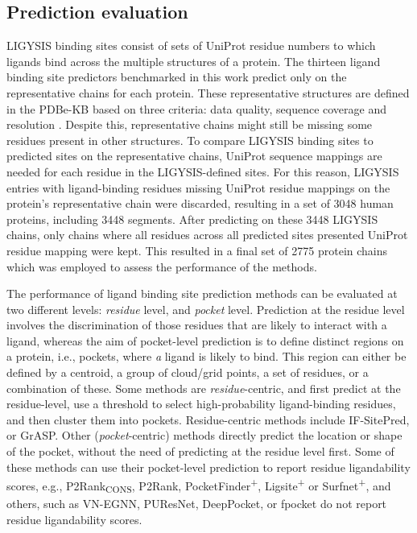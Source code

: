 \subsection{Prediction evaluation}

LIGYSIS binding sites consist of sets of UniProt residue numbers to which ligands bind across the multiple structures of a protein. The thirteen ligand binding site predictors benchmarked in this work predict only on the representative chains for each protein. These representative structures are defined in the PDBe-KB based on three criteria: data quality, sequence coverage and resolution \cite{ELLAWAY_2024_CONFORMATIONS}. Despite this, representative chains might still be missing some residues present in other structures. To compare LIGYSIS binding sites to predicted sites on the representative chains, UniProt sequence mappings are needed for each residue in the LIGYSIS-defined sites. For this reason, LIGYSIS entries with ligand-binding residues missing UniProt residue mappings on the protein’s representative chain were discarded, resulting
in a set of 3048 human proteins, including 3448 segments. After predicting on these 3448 LIGYSIS chains, only chains where all residues across all predicted sites presented UniProt residue mapping were kept. This resulted in a final set of 2775 protein chains which was employed to assess the performance of the methods.

The performance of ligand binding site prediction methods can be evaluated at two different levels: \textit{residue} level, and \textit{pocket} level. Prediction at the residue level involves the discrimination of those residues that are likely to interact with a ligand, whereas the aim of pocket-level prediction is to define distinct regions on a protein, i.e., pockets, where \textit{a} ligand is likely to bind. This region can either be defined by a centroid, a group of cloud/grid points, a set of residues, or a combination of these. Some methods are \textit{residue}-centric, and first predict at the residue-level, use a threshold to select high-probability ligand-binding residues, and then cluster them into pockets. Residue-centric methods include IF-SitePred, or GrASP. Other (\textit{pocket}-centric) methods directly predict the location or shape of the pocket, without the need of predicting at the residue level first. Some of these methods can use their pocket-level prediction to report residue ligandability scores, e.g., P2Rank\textsubscript{CONS}, P2Rank, PocketFinder\textsuperscript{+}, Ligsite\textsuperscript{+} or Surfnet\textsuperscript{+}, and others, such as VN-EGNN, PUResNet, DeepPocket, or fpocket do not report residue ligandability scores.

